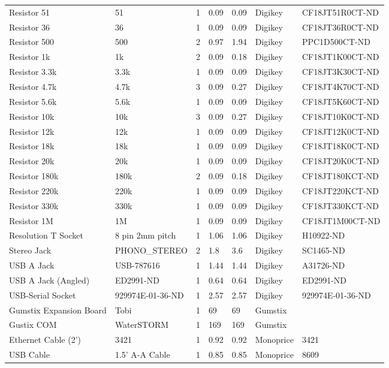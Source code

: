 \begin{landscape}
\begin{center}
\begin{longtable}{|p{2in}|p{1.5in}|p{.75in}|p{.5in}|p{.5in}|p{1in}|p{1.5in}|}
Resistor 51 & 51 & 1 & 0.09 & 0.09 & Digikey & CF18JT51R0CT-ND\\ 
Resistor 36 & 36 & 1 & 0.09 & 0.09 & Digikey & CF18JT36R0CT-ND\\ 
Resistor 500 & 500 & 2 & 0.97 & 1.94 & Digikey & PPC1D500CT-ND\\ 
Resistor 1k & 1k & 2 & 0.09 & 0.18 & Digikey & CF18JT1K00CT-ND\\ 
Resistor 3.3k & 3.3k & 1 & 0.09 & 0.09 & Digikey & CF18JT3K30CT-ND\\ 
Resistor 4.7k & 4.7k & 3 & 0.09 & 0.27 & Digikey & CF18JT4K70CT-ND\\ 
Resistor 5.6k & 5.6k & 1 & 0.09 & 0.09 & Digikey & CF18JT5K60CT-ND\\ 
Resistor 10k & 10k & 3 & 0.09 & 0.27 & Digikey & CF18JT10K0CT-ND\\ 
Resistor 12k & 12k & 1 & 0.09 & 0.09 & Digikey & CF18JT12K0CT-ND\\ 
Resistor 18k & 18k & 1 & 0.09 & 0.09 & Digikey & CF18JT18K0CT-ND\\ 
Resistor 20k & 20k & 1 & 0.09 & 0.09 & Digikey & CF18JT20K0CT-ND\\ 
Resistor 180k & 180k & 2 & 0.09 & 0.18 & Digikey & CF18JT180KCT-ND\\ 
Resistor 220k & 220k & 1 & 0.09 & 0.09 & Digikey & CF18JT220KCT-ND\\ 
Resistor 330k & 330k & 1 & 0.09 & 0.09 & Digikey & CF18JT330KCT-ND\\ 
Resistor 1M & 1M & 1 & 0.09 & 0.09 & Digikey & CF18JT1M00CT-ND\\ 
Resolution T Socket & 8 pin 2mm pitch & 1 & 1.06 & 1.06 & Digikey & H10922-ND\\ 
Stereo Jack & PHONO\_STEREO & 2 & 1.8 & 3.6 & Digikey & SC1465-ND\\ 
USB A Jack & USB-787616 & 1 & 1.44 & 1.44 & Digikey & A31726-ND\\ 
USB A Jack (Angled) & ED2991-ND & 1 & 0.64 & 0.64 & Digikey & ED2991-ND\\ 
USB-Serial Socket & 929974E-01-36-ND & 1 & 2.57 & 2.57 & Digikey & 929974E-01-36-ND\\ 
Gumstix Expansion Board & Tobi & 1 & 69 & 69 & Gumstix & \\ 
Gustix COM & WaterSTORM & 1 & 169 & 169 & Gumstix & \\ 
Ethernet Cable (2') & 3421 & 1 & 0.92 & 0.92 & Monoprice & 3421\\ 
USB Cable & 1.5' A-A Cable & 1 & 0.85 & 0.85 & Monoprice & 8609\\ 

\end{longtable}
\end{center}
\end{landscape}
